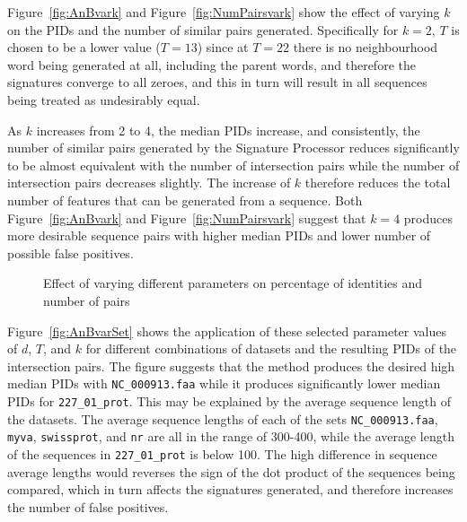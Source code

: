 \documentclass[titlepage]{csetr}
\begin{document}
Figure~\ref{fig:AnBvark} and Figure~\ref{fig:NumPairsvark} show the effect of varying $k$ on the PIDs and the number of similar pairs generated. Specifically for $k=2$, $T$ is chosen to be a lower value ($T=13$) since at $T=22$ there is no neighbourhood word being generated at all, including the parent words, and therefore the signatures converge to all zeroes, and this in turn will result in all sequences being treated as undesirably equal. 

As $k$ increases from 2 to 4, the median PIDs increase, and consistently, the number of similar pairs generated by the Signature Processor reduces significantly to be almost equivalent with the number of intersection pairs while the number of intersection pairs decreases slightly. The increase of $k$ therefore reduces the total number of features that can be generated from a sequence. Both Figure~\ref{fig:AnBvark} and Figure~\ref{fig:NumPairsvark} suggest that $k=4$ produces more desirable sequence pairs with higher median PIDs and lower number of possible false positives.

\begin{figure}[t]
\centering
{}
\caption{Effect of varying different parameters on percentage of identities and number of pairs}
\label{fig:exp-quality-varSet}
\end{figure}

Figure~\ref{fig:AnBvarSet} shows the application of these selected parameter values of $d$, $T$, and $k$ for different combinations of datasets and the resulting PIDs of the intersection pairs. The figure suggests that the method produces the desired high median PIDs with \texttt{NC\_000913.faa} while it produces significantly lower median PIDs for \texttt{227\_01\_prot}. This may be explained by the average sequence length of the datasets. The average sequence lengths of each of the sets \texttt{NC\_000913.faa}, \texttt{myva}, \texttt{swissprot}, and \texttt{nr} are all in the range of  300-400, while the average length of the sequences in \texttt{227\_01\_prot} is below 100. The high difference in sequence average lengths would reverses the sign of the dot product of the sequences being compared, which in turn affects the signatures generated, and therefore increases the number of false positives.
\end{document}

